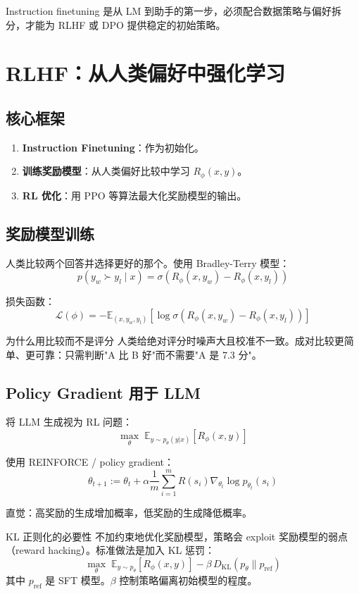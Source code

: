 \documentclass[a4paper]{article}
\begin{document}
Instruction finetuning 是从 LM 到助手的第一步，必须配合数据策略与偏好拆分，才能为 RLHF 或 DPO 提供稳定的初始策略。

\section{RLHF：从人类偏好中强化学习}

\subsection{核心框架}

\begin{enumerate}
    \item \textbf{Instruction Finetuning}：作为初始化。
    \item \textbf{训练奖励模型}：从人类偏好比较中学习 $R_\phi(x, y)$。
    \item \textbf{RL 优化}：用 PPO 等算法最大化奖励模型的输出。
\end{enumerate}

\subsection{奖励模型训练}

人类比较两个回答并选择更好的那个。使用 Bradley-Terry 模型：
$$p(y_w \succ y_l \mid x) = \sigma(R_\phi(x, y_w) - R_\phi(x, y_l))$$

损失函数：
$$\mathcal{L}(\phi) = -\mathbb{E}_{(x, y_w, y_l)}\left[\log \sigma(R_\phi(x, y_w) - R_\phi(x, y_l))\right]$$

\begin{knowledgebox}{为什么用比较而不是评分}
人类给绝对评分时噪声大且校准不一致。成对比较更简单、更可靠：只需判断"A 比 B 好"而不需要"A 是 7.3 分"。
\end{knowledgebox}

\subsection{Policy Gradient 用于 LLM}

将 LLM 生成视为 RL 问题：
$$\max_\theta \; \mathbb{E}_{y \sim p_\theta(y|x)} \left[R_\phi(x, y)\right]$$

使用 REINFORCE / policy gradient：
$$\theta_{t+1} := \theta_t + \alpha \frac{1}{m}\sum_{i=1}^{m} R(s_i) \nabla_{\theta_t} \log p_{\theta_t}(s_i)$$

直觉：高奖励的生成增加概率，低奖励的生成降低概率。

\begin{warningbox}{KL 正则化的必要性}
不加约束地优化奖励模型，策略会 exploit 奖励模型的弱点（reward hacking）。标准做法是加入 KL 惩罚：
$$\max_\theta \; \mathbb{E}_{y \sim p_\theta}\left[R_\phi(x, y)\right] - \beta \, D_{\mathrm{KL}}(p_\theta \| p_{\mathrm{ref}})$$
其中 $p_{\mathrm{ref}}$ 是 SFT 模型。$\beta$ 控制策略偏离初始模型的程度。
\end{warningbox}
\end{document}
